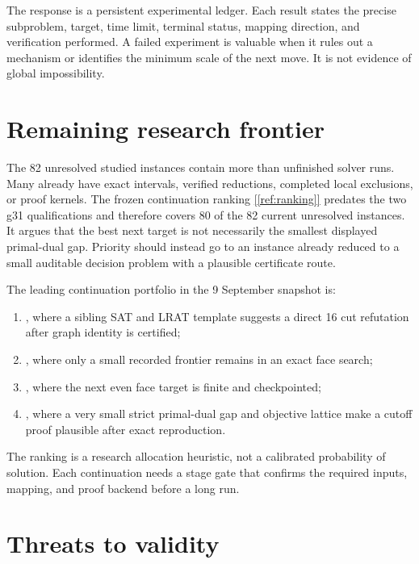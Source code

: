 \documentclass[11pt,letterpaper]{article}
\newcommand{\sourcecite}[1]{\hyperref[#1]{[\ref*{#1}]}}
\begin{document}
The response is a persistent experimental ledger. Each result states the precise subproblem, target, time limit, terminal status, mapping direction, and verification performed. A failed experiment is valuable when it rules out a mechanism or identifies the minimum scale of the next move. It is not evidence of global impossibility.

\section{Remaining research frontier}

The 82 unresolved studied instances contain more than unfinished solver runs. Many already have exact intervals, verified reductions, completed local exclusions, or proof kernels. The frozen continuation ranking \sourcecite{ref:ranking} predates the two g31 qualifications and therefore covers 80 of the 82 current unresolved instances. It argues that the best next target is not necessarily the smallest displayed primal-dual gap. Priority should instead go to an instance already reduced to a small auditable decision problem with a plausible certificate route.

The leading continuation portfolio in the 9 September snapshot is:

\begin{enumerate}
\item \texttt{}, where a sibling SAT and LRAT template suggests a direct 16 cut refutation after graph identity is certified;
\item \texttt{}, where only a small recorded frontier remains in an exact face search;
\item \texttt{}, where the next even face target is finite and checkpointed;
\item \texttt{}, where a very small strict primal-dual gap and objective lattice make a cutoff proof plausible after exact reproduction.
\end{enumerate}

The ranking is a research allocation heuristic, not a calibrated probability of solution. Each continuation needs a stage gate that confirms the required inputs, mapping, and proof backend before a long run.

\section{Threats to validity}
\end{document}
